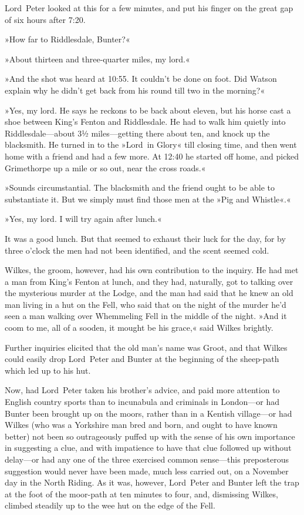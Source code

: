 \begin{a4}
\clearpage
\end{a4}

Lord~Peter looked at this for a few minutes, and put his finger on the great gap of six hours after 7:20.

»How far to Riddlesdale, Bunter?«

»About thirteen and three-quarter miles, my lord.«

»And the shot was heard at 10:55. It couldn't be done on foot. Did Watson explain why he didn't get back from his round till two in the morning?«

»Yes, my lord. He says he reckons to be back about eleven, but his horse cast a shoe between King's Fenton and Riddlesdale. He had to walk him quietly into Riddlesdale—about 3½ miles—getting there about ten, and knock up the blacksmith. He turned in to the »Lord~in Glory« till closing time, and then went home with a friend and had a few more. At 12:40 he started off home, and picked Grimethorpe up a mile or so out, near the cross roads.«

»Sounds circumstantial. The blacksmith and the friend ought to be able to substantiate it. But we simply must find those men at the »Pig and Whistle«.«

»Yes, my lord. I will try again after lunch.«

It was a good lunch. But that seemed to exhaust their luck for the day, for by three o'clock the men had not been identified, and the scent seemed cold.

Wilkes, the groom, however, had his own contribution to the inquiry. He had met a man from King's Fenton at lunch, and they had, naturally, got to talking over the mysterious murder at the Lodge, and the man had said that he knew an old man living in a hut on the Fell, who said that on the night of the murder he'd seen a man walking over Whemmeling Fell in the middle of the night. »And it coom to me, all of a sooden, it mought be his grace,« said Wilkes brightly.

Further inquiries elicited that the old man's name was Groot, and that Wilkes could easily drop Lord~Peter and Bunter at the beginning of the sheep-path which led up to his hut.

Now, had Lord~Peter taken his brother's advice, and paid more attention to English country sports than to incunabula and criminals in London—or had Bunter been brought up on the moors, rather than in a Kentish village—or had Wilkes (who was a Yorkshire man bred and born, and ought to have known better) not been so outrageously puffed up with the sense of his own importance in suggesting a clue, and with impatience to have that clue followed up without delay—or had any one of the three exercised common sense—this preposterous suggestion would never have been made, much less carried out, on a November day in the North Riding. As it was, however, Lord~Peter and Bunter left the trap at the foot of the moor-path at ten minutes to four, and, dismissing Wilkes, climbed steadily up to the wee hut on the edge of the Fell.

